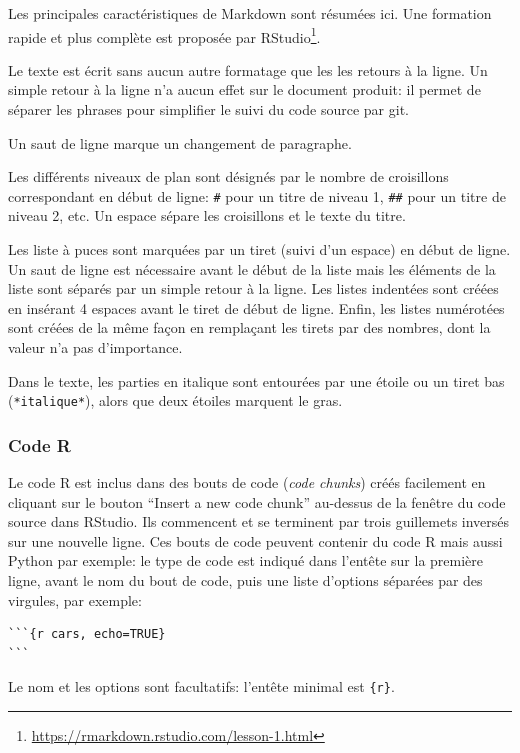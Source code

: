 \documentclass[
  12pt,
  french,
  a4paper,
  extrafontsizes,onecolumn,openright
  ]{memoir}
\begin{document}
Les principales caractéristiques de Markdown sont résumées ici.
Une formation rapide et plus complète est proposée par RStudio\footnote{\url{https://rmarkdown.rstudio.com/lesson-1.html}}.

Le texte est écrit sans aucun autre formatage que les les retours à la ligne.
Un simple retour à la ligne n'a aucun effet sur le document produit: il permet de séparer les phrases pour simplifier le suivi du code source par git.

Un saut de ligne marque un changement de paragraphe.

Les différents niveaux de plan sont désignés par le nombre de croisillons correspondant en début de ligne: \texttt{\#} pour un titre de niveau 1, \texttt{\#\#} pour un titre de niveau 2, etc.
Un espace sépare les croisillons et le texte du titre.

Les liste à puces sont marquées par un tiret (suivi d'un espace) en début de ligne.
Un saut de ligne est nécessaire avant le début de la liste mais les éléments de la liste sont séparés par un simple retour à la ligne.
Les listes indentées sont créées en insérant 4 espaces avant le tiret de début de ligne.
Enfin, les listes numérotées sont créées de la même façon en remplaçant les tirets par des nombres, dont la valeur n'a pas d'importance.

Dans le texte, les parties en italique sont entourées par une étoile ou un tiret bas (\texttt{*italique*}), alors que deux étoiles marquent le gras.

\hypertarget{code-r}{%
\subsubsection{Code R}\label{code-r}}

Le code R est inclus dans des bouts de code (\emph{code chunks}) créés facilement en cliquant sur le bouton \enquote{Insert a new code chunk} au-dessus de la fenêtre du code source dans RStudio.
Ils commencent et se terminent par trois guillemets inversés sur une nouvelle ligne.
Ces bouts de code peuvent contenir du code R mais aussi Python par exemple: le type de code est indiqué dans l'entête sur la première ligne, avant le nom du bout de code, puis une liste d'options séparées par des virgules, par exemple:

\begin{verbatim}
```{r cars, echo=TRUE}
```
\end{verbatim}

Le nom et les options sont facultatifs: l'entête minimal est \texttt{\{r\}}.
\end{document}
